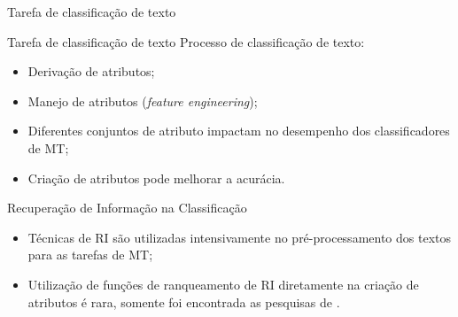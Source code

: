 \documentclass[%
  10pt,%
  aspectratio = 169,%
  compress,%
  t,%
]{beamer}%
\begin{document}
    \begin{frame}{}{Tarefa de classificação de texto}
        
    \end{frame}
    
    \begin{frame}{}{Tarefa de classificação de texto}
        Processo de classificação de texto:
        \begin{itemize}
            \item Derivação de atributos;
            \item Manejo de atributos (\textit{feature engineering});
            \item Diferentes conjuntos de atributo impactam no desempenho dos classificadores de MT;
            \item Criação de atributos pode melhorar a acurácia.
        \end{itemize}
        \begin{block}{Recuperação de Informação na Classificação}
            \begin{itemize}
                \item Técnicas de RI são utilizadas intensivamente no pré-processamento dos textos para as tarefas de MT;
                \item Utilização de funções de ranqueamento de RI diretamente na criação de atributos é rara, somente foi encontrada as pesquisas de \cite{WEREN_MESTRADO_2014}.
            \end{itemize}
        \end{block}
    \end{frame}
    
\end{document}

